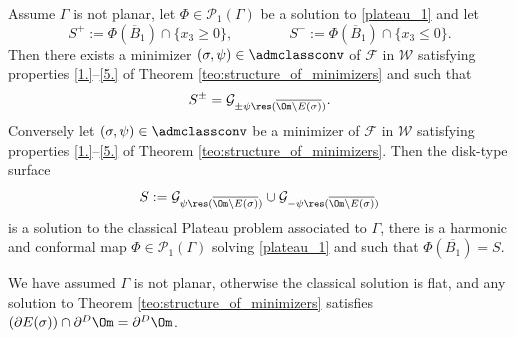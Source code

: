 \begin{theorem}[The disk-type Plateau problem ($n=1$)]
\label{teo:the_disk_type_Plateau_problem_n=1}
Assume $\Gamma$ is not planar, let $\Phi\in\mathcal{P}_1(\Gamma)$ be a solution to \eqref{plateau_1} and let
\[
S^+:=\Phi(\overline B_1)\cap \{x_3\ge0\},
\qquad \qquad S^-:=\Phi(\overline B_1)\cap \{x_3\le0\}.
\]
Then there exists a minimizer $(\sigma,\psi)\in \admclassconv$ of $\mathcal F$ in
$\mathcal W$
satisfying properties \ref{1.}--\ref{5.} of Theorem \ref{teo:structure_of_minimizers} and such that
\begin{equation}\label{eq:graph}
S^{\pm}=\mathcal G_{\pm\psi\res (\overline{\Om\setminus E(\sigma)})}.
\end{equation}
Conversely let $(\sigma,\psi)\in \admclassconv$ be a minimizer of $\mathcal F$ in $\mathcal W$ satisfying properties \ref{1.}--\ref{5.} of Theorem \ref{teo:structure_of_minimizers}. Then the disk-type surface
\[
S:=\mathcal G_{\psi\res (\overline{\Om\setminus E(\sigma)})}\cup\mathcal G_{-\psi\res (\overline{\Om\setminus E(\sigma)})}
\]
is a solution to the classical Plateau problem associated to $\Gamma$, \ie there is a harmonic and conformal map $\Phi\in\mathcal{P}_1(\Gamma)$
solving \eqref{plateau_1} and such that $\Phi(\overline{B_1})=S$.
\end{theorem}
{ We have assumed $\Gamma$ is not planar, otherwise the classical solution is flat, and any solution to Theorem \ref{teo:structure_of_minimizers} satisfies $(\partial E(\sigma))\cap \partial^D\Om=\partial^D\Om$.}

